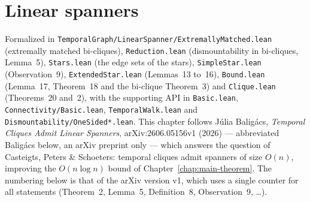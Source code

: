 \chapter{Linear spanners}
\label{chap:linear-spanners}

\noindent Formalized in \texttt{TemporalGraph/LinearSpanner/ExtremallyMatched.lean}
(extremally matched bi-cliques), \texttt{Reduction.lean} (dismountability in
bi-cliques, Lemma~5), \texttt{Stars.lean} (the edge sets of the stars),
\texttt{SimpleStar.lean} (Observation~9), \texttt{ExtendedStar.lean}
(Lemmas~13 to~16), \texttt{Bound.lean} (Lemma~17, Theorem~18 and the
bi-clique Theorem~3) and \texttt{Clique.lean} (Theorems~20 and~2), with the
supporting API in \texttt{Basic.lean}, \texttt{Connectivity/Basic.lean},
\texttt{TemporalWalk.lean} and \texttt{Dismountability/OneSided*.lean}.
This chapter follows Júlia Baligács, \emph{Temporal Cliques Admit Linear
Spanners}, arXiv:2606.05156v1 (2026) --- abbreviated Baligács below, an arXiv
preprint only --- which answers the question of Casteigts, Peters \&
Schoeters: temporal cliques admit spanners of size $O(n)$, improving the
$O(n \log n)$ bound of Chapter~\ref{chap:main-theorem}. The numbering below is
that of the arXiv version v1, which uses a single counter for all statements
(Theorem~2, Lemma~5, Definition~8, Observation~9, \ldots).

